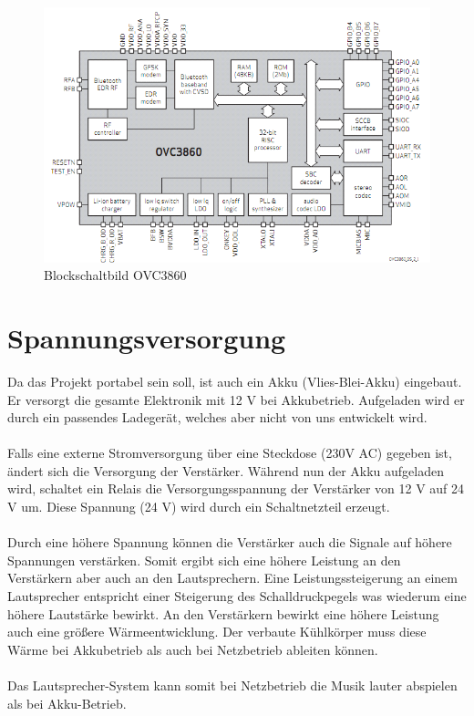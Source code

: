 \begin{figure} [H]
	\centering
	\includegraphics[width=1\textwidth]{img/BTModul/blockschaltbild.png}
	\caption[Blockschaltbild OVC3860]{Blockschaltbild OVC3860\footnotemark}\label {fig:3.3.1}
\end{figure}

\newpage
\section{Spannungsversorgung}\label{sec:3.4}
Da das Projekt portabel sein soll, ist auch ein Akku (Vlies-Blei-Akku) eingebaut.
Er versorgt die gesamte Elektronik mit 12 V bei Akkubetrieb.
Aufgeladen wird er durch ein passendes Ladegerät, welches aber nicht von uns entwickelt wird.
\\ \\
Falls eine externe Stromversorgung über eine Steckdose (230V AC) gegeben ist, ändert sich die Versorgung der Verstärker.
Während nun der Akku aufgeladen wird, schaltet ein Relais die Versorgungsspannung der Verstärker von 12 V auf 24 V um.
Diese Spannung (24 V) wird durch ein Schaltnetzteil erzeugt.
\\ \\
Durch eine höhere Spannung können die Verstärker auch die Signale auf höhere Spannungen verstärken.
Somit ergibt sich eine höhere Leistung an den Verstärkern aber auch an den Lautsprechern.
Eine Leistungssteigerung an einem Lautsprecher entspricht einer Steigerung des Schalldruckpegels was wiederum eine höhere Lautstärke bewirkt.
An den Verstärkern bewirkt eine höhere Leistung auch eine größere Wärmeentwicklung.
Der verbaute Kühlkörper muss diese Wärme bei Akkubetrieb als auch bei Netzbetrieb ableiten können.
\\ \\
Das Lautsprecher-System kann somit bei Netzbetrieb die Musik lauter abspielen als bei Akku-Betrieb.



